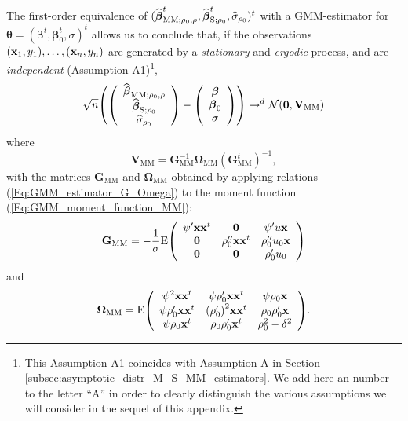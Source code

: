 The first-order equivalence of $(\sthat{\boldsymbol\beta}_{\mathrm{MM}%
;\rho_{0},\rho}^{t},\sthat{\boldsymbol\beta}_{\mathrm{S};\rho_{0}}%
^{t},\sthat{\sigma}_{\rho_{0}})^{t}$ with a GMM-estimator for
$\boldsymbol{\theta}=(\boldsymbol\beta^{t},\boldsymbol\beta_{0}^{t}%
,\sigma)^{t}$ allows us to conclude that, if the observations $\left(
\stvec{x}_{1},y_{1}\right)  ,\ldots,\left(  \stvec{x}_{n},y_{n}\right)  $
are generated by a \emph{stationary} and \emph{ergodic} process, and are
\emph{independent} (Assumption A1)\footnote{This Assumption A1 coincides
with Assumption A in Section \ref{subsec:asymptotic_distr_M_S_MM_estimators}.
We add here an number to the letter “A” in order to clearly distinguish the
various assumptions we will consider in the sequel of this appendix.},
\[
\sqrt{n}\left(  \left(
\begin{array}
[c]{c}%
\sthat{\boldsymbol\beta}_{\mathrm{MM};\rho_{0},\rho}\\
\sthat{\boldsymbol\beta}_{\mathrm{S};\rho_{0}}\\
\sthat{\sigma}_{\rho_{0}}%
\end{array}
\right)  -\left(
\begin{array}
[c]{c}%
\boldsymbol\beta\\
\boldsymbol\beta_{0}\\
\sigma
\end{array}
\right)  \right)  \rightarrow^{d}\mathcal{N}(\mathbf{0},\mathbf{V}%
_{\mathrm{MM}})
\]
where
\[
\mathbf{V}_{\mathrm{MM}}=\mathbf{G}_{\mathrm{MM}}^{-1}\boldsymbol{\Omega
}_{\mathrm{MM}}\left(  \mathbf{G}_{\mathrm{MM}}^{t}\right)  ^{-1},
\]
with the matrices $\mathbf{G}_{\mathrm{MM}}$ and $\boldsymbol{\Omega
}_{\mathrm{MM}}$ obtained by applying relations
(\ref{Eq:GMM_estimator_G_Omega}) to the moment function
(\ref{Eq:GMM_moment_function_MM}):
\[
\mathbf{G}_{\mathrm{MM}}=-\frac{1}{\sigma}\mathrm{E}\left(
\begin{array}
[c]{ccc}%
\psi^{\prime}\mathbf{xx}^{t} & \mathbf{0} & \psi^{\prime}u\stvec{x}\\
\mathbf{0} & \rho_{0}^{\prime\prime}\mathbf{xx}^{t} & \rho_{0}^{\prime\prime
}u_{0}\stvec{x}\\
\mathbf{0} & \mathbf{0} & \rho_{0}^{\prime}u_{0}%
\end{array}
\right)
\]
and
\[
\boldsymbol{\Omega}_{\mathrm{MM}}=\mathrm{E}\left(
\begin{array}
[c]{ccc}%
\psi^{2}\mathbf{xx}^{t} & \psi\rho_{0}^{\prime}\mathbf{xx}^{t} & \psi\rho
_{0}\stvec{x}\\
\psi\rho_{0}^{\prime}\mathbf{xx}^{t} & \left(  \rho_{0}^{\prime}\right)
^{2}\mathbf{xx}^{t} & \rho_{0}\rho_{0}^{\prime}\stvec{x}\\
\psi\rho_{0}\stvec{x}^{t} & \rho_{0}\rho_{0}^{\prime}\stvec{x}^{t} &
\rho_{0}^{2}-\delta^{2}%
\end{array}
\right)  .
\]
